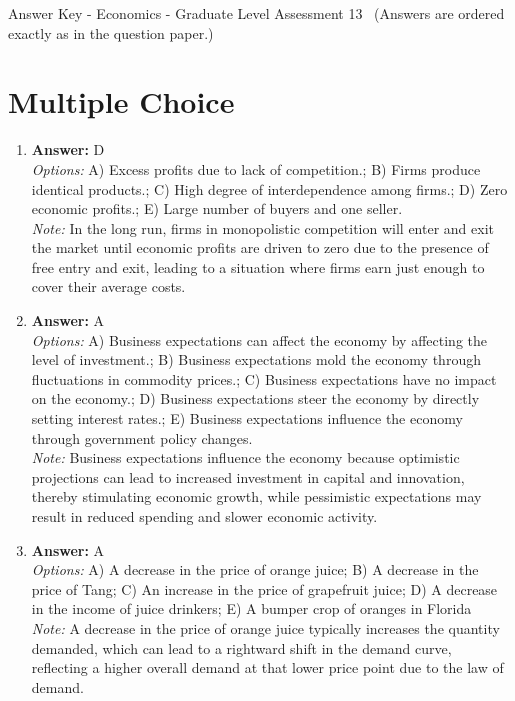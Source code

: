 \documentclass[12pt]{article}
\begin{document}
\begin{center}
Answer Key - Economics - Graduate Level Assessment 13 \
\small (Answers are ordered exactly as in the question paper.)
\end{center}

\section*{Multiple Choice}
\begin{enumerate}[label=\arabic*.]
\item \textbf{Answer:} D
\\ \textit{Options:} A) Excess profits due to lack of competition.; B) Firms produce identical products.; C) High degree of interdependence among firms.; D) Zero economic profits.; E) Large number of buyers and one seller.
\\ \textit{Note:} In the long run, firms in monopolistic competition will enter and exit the market until economic profits are driven to zero due to the presence of free entry and exit, leading to a situation where firms earn just enough to cover their average costs.
\item \textbf{Answer:} A
\\ \textit{Options:} A) Business expectations can affect the economy by affecting the level of investment.; B) Business expectations mold the economy through fluctuations in commodity prices.; C) Business expectations have no impact on the economy.; D) Business expectations steer the economy by directly setting interest rates.; E) Business expectations influence the economy through government policy changes.
\\ \textit{Note:} Business expectations influence the economy because optimistic projections can lead to increased investment in capital and innovation, thereby stimulating economic growth, while pessimistic expectations may result in reduced spending and slower economic activity.
\item \textbf{Answer:} A
\\ \textit{Options:} A) A decrease in the price of orange juice; B) A decrease in the price of Tang; C) An increase in the price of grapefruit juice; D) A decrease in the income of juice drinkers; E) A bumper crop of oranges in Florida
\\ \textit{Note:} A decrease in the price of orange juice typically increases the quantity demanded, which can lead to a rightward shift in the demand curve, reflecting a higher overall demand at that lower price point due to the law of demand.

\end{enumerate}
\end{document}
